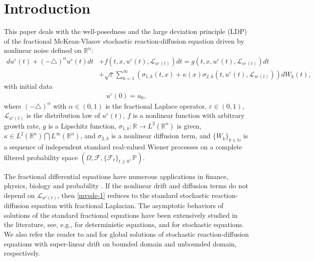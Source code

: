 \documentclass[11pt]{article}
\numberwithin{equation}{section}
\theoremstyle{plain}
\def\geq{\geqslant}
\begin{document}

\maketitle



\section{Introduction}
 This paper
 deals with
 the well-posedness and
 the  large deviation
 principle (LDP)   of
 the fractional McKean-Vlasov stochastic reaction-diffusion equation
 driven by nonlinear noise defined on $\mathbb{R}^n$:
\begin{align} \label{mvsde-1}
    d u^\varepsilon(t) + (-\triangle)^\alpha u^\varepsilon(t) dt
           & + f(t, x, u^\varepsilon (t), \mathcal{L}_{u^\varepsilon (t)} ) dt
             = g(t,x,u^\varepsilon (t), \mathcal {L}_{u^\varepsilon (t)} )dt
               \nonumber \\
           & + \sqrt{\varepsilon}
                  \sum_{k=1}^{\infty}
                          \left( \sigma_{1,k}(t,x) + \kappa(x) \sigma_{2,k}(t, u^\varepsilon (t), \mathcal {L}_{u^\varepsilon (t)})
                          \right) dW_k(t),
\end{align}
 with initial data
\begin{align}\label{mvsde-1 IV}
   u^\varepsilon(0) = u_0,
\end{align}
 where
 $(-\triangle)^\alpha$ with $\alpha \in (0,1)$ is the fractional Laplace operator,
 $\varepsilon \in (0,1)$,
 $\mathcal{L}_{u^\varepsilon (t)}$
 is the distribution  law of   $u^\varepsilon (t)$,
 $f$ is a nonlinear  function with arbitrary growth rate,
 $g$ is a Lipschitz function,
 $\sigma_{1,k} : \mathbb{R} \to L^2(\mathbb{R}^n)$
 is given,
 $\kappa \in L^2(\mathbb{R}^n) \bigcap L^\infty(\mathbb{R}^n)$,
and
 $\sigma_{2,k}$ is  a nonlinear diffusion term,
 and
 $\{W_k\}_{k\in \mathbb{N}}$ is a sequence of independent
 standard  real-valued Wiener processes
 on a complete filtered probability space $\left( \Omega, \mathcal{F}, \{\mathcal{F}_t\}_{t \geq 0}, \mathbb{P} \right)$.




The fractional
 differential  equations
 have numerous  applications in finance, physics, biology and probability
   \cite{at2005PA, gm2006PTRF, jara2009CPAM}.
If  the nonlinear drift and diffusion terms
do not depend on
 $\mathcal{L}_{u^\varepsilon (t)}$, then
  \eqref{mvsde-1}
  reduces to the  standard stochastic reaction-diffusion equation with fractional Laplacian.
  The asymptotic behaviors of solutions
  of the standard
  fractional   equations
  have been extensively studied in the
  literature, see, e.g.,
   \cite{pg2013AA, lblz2015JDE, gw2016DCDS}
   for deterministic equations, and
  \cite{gz2014NA, wangb2017NA, glwy2018JDE, bm2019SIMA, wangb2019JDE, cw2021Nonl, cw2022JDE, hzsg2022JDE}
    for stochastic equations.
  We also refer the reader to \cite{dkz2019AP} and \cite{salins2022SD}
  for global solutions of stochastic reaction-diffusion equations with super-linear drift on bounded domain and unbounded domain, respectively.
\end{document}
